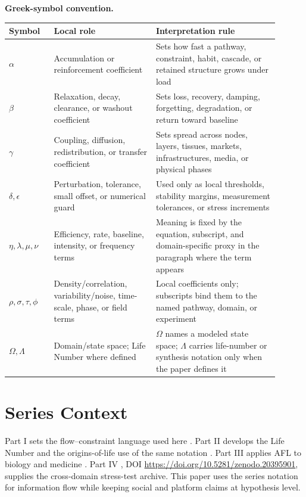 \documentclass[12pt,a4paper]{article}
\begin{document}
\noindent\textbf{Greek-symbol convention.}
\begin{center}
{\small
\begin{tabular}{p{0.15\linewidth}p{0.34\linewidth}p{0.41\linewidth}}
\hline
Symbol & Local role & Interpretation rule \\
\hline
$\alpha$ & Accumulation or reinforcement coefficient & Sets how fast a pathway, constraint, habit, cascade, or retained structure grows under load \\
$\beta$ & Relaxation, decay, clearance, or washout coefficient & Sets loss, recovery, damping, forgetting, degradation, or return toward baseline \\
$\gamma$ & Coupling, diffusion, redistribution, or transfer coefficient & Sets spread across nodes, layers, tissues, markets, infrastructures, media, or physical phases \\
$\delta,\epsilon$ & Perturbation, tolerance, small offset, or numerical guard & Used only as local thresholds, stability margins, measurement tolerances, or stress increments \\
$\eta,\lambda,\mu,\nu$ & Efficiency, rate, baseline, intensity, or frequency terms & Meaning is fixed by the equation, subscript, and domain-specific proxy in the paragraph where the term appears \\
$\rho,\sigma,\tau,\phi$ & Density/correlation, variability/noise, time-scale, phase, or field terms & Local coefficients only; subscripts bind them to the named pathway, domain, or experiment \\
$\Omega,\Lambda$ & Domain/state space; Life Number where defined & $\Omega$ names a modeled state space; $\Lambda$ carries life-number or synthesis notation only when the paper defines it \\
\hline
\end{tabular}
}
\end{center}

\section{Series Context}

Part I sets the flow--constraint language used here \cite{MujjabiPartI2026}.
Part II develops the Life Number and the origins-of-life use of the same notation
\cite{MujjabiPartII2026}. Part III applies AFL to biology and medicine
\cite{MujjabiPartIII2026}. Part IV \cite{MujjabiPartIV2026}, DOI \url{https://doi.org/10.5281/zenodo.20395901}, supplies the
cross-domain stress-test archive. This paper uses the series notation for
information flow while keeping social and platform claims at hypothesis level.
\end{document}
